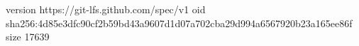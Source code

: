 version https://git-lfs.github.com/spec/v1
oid sha256:4d85e3dfc90cf2b59bd43a9607d1d07a702cba29d994a6567920b23a165ee86f
size 17639
